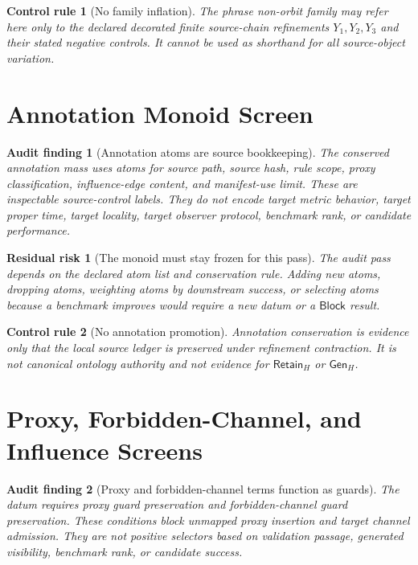 \documentclass[11pt]{article}
\newcommand{\RetainH}{\mathsf{Retain}_{H}}
\newcommand{\GenH}{\mathsf{Gen}_{H}}
\newcommand{\Block}{\mathsf{Block}}
\newtheorem{auditfinding}{Audit finding}
\newtheorem{residualrisk}{Residual risk}
\newtheorem{controlrule}{Control rule}
\begin{document}
\begin{controlrule}[No family inflation]
The phrase non-orbit family may refer here only to the declared decorated
finite source-chain refinements \(Y_{1},Y_{2},Y_{3}\) and their stated
negative controls. It cannot be used as shorthand for all source-object
variation.
\end{controlrule}

\section{Annotation Monoid Screen}

\begin{auditfinding}[Annotation atoms are source bookkeeping]
The conserved annotation mass uses atoms for source path, source hash,
rule scope, proxy classification, influence-edge content, and
manifest-use limit. These are inspectable source-control labels. They do
not encode target metric behavior, target proper time, target locality,
target observer protocol, benchmark rank, or candidate performance.
\end{auditfinding}

\begin{residualrisk}[The monoid must stay frozen for this pass]
The audit pass depends on the declared atom list and conservation rule.
Adding new atoms, dropping atoms, weighting atoms by downstream success,
or selecting atoms because a benchmark improves would require a new
datum or a \(\Block\) result.
\end{residualrisk}

\begin{controlrule}[No annotation promotion]
Annotation conservation is evidence only that the local source ledger is
preserved under refinement contraction. It is not canonical ontology
authority and not evidence for \(\RetainH\) or \(\GenH\).
\end{controlrule}

\section{Proxy, Forbidden-Channel, and Influence Screens}

\begin{auditfinding}[Proxy and forbidden-channel terms function as guards]
The datum requires proxy guard preservation and forbidden-channel guard
preservation. These conditions block unmapped proxy insertion and target
channel admission. They are not positive selectors based on validation
passage, generated visibility, benchmark rank, or candidate success.
\end{auditfinding}
\end{document}

